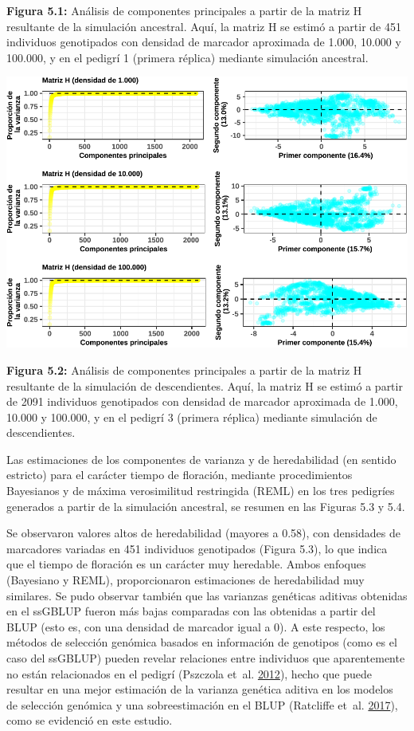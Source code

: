 \documentclass[11pt,spanish,a4paper,oneside,]{book} %
\begin{document}
\noindent
\textbf{Figura 5.1:} Análisis de componentes principales a partir de la matriz H resultante de la simulación ancestral. Aquí, la matriz H se estimó a partir de 451 individuos genotipados con densidad de marcador aproximada de 1.000, 10.000 y 100.000, y en el pedigrí 1 (primera réplica) mediante simulación ancestral.

\begin{center}\includegraphics[width=1\linewidth]{figures/Graf_PCA_mH_SeqBreed} \end{center}

\noindent
\textbf{Figura 5.2:} Análisis de componentes principales a partir de la matriz H resultante de la simulación de descendientes. Aquí, la matriz H se estimó a partir de 2091 individuos genotipados con densidad de marcador aproximada de 1.000, 10.000 y 100.000, y en el pedigrí 3 (primera réplica) mediante simulación de descendientes.

\hspace*{1em}

Las estimaciones de los componentes de varianza y de heredabilidad (en sentido estricto) para el carácter tiempo de floración, mediante procedimientos Bayesianos y de máxima verosimilitud restringida (REML) en los tres pedigríes generados a partir de la simulación ancestral, se resumen en las Figuras 5.3 y 5.4.

Se observaron valores altos de heredabilidad (mayores a 0.58), con densidades de marcadores variadas en 451 individuos genotipados (Figura 5.3), lo que indica que el tiempo de floración es un carácter muy heredable. Ambos enfoques (Bayesiano y REML), proporcionaron estimaciones de heredabilidad muy similares. Se pudo observar también que las varianzas genéticas aditivas obtenidas en el ssGBLUP fueron más bajas comparadas con las obtenidas a partir del BLUP (esto es, con una densidad de marcador igual a 0). A este respecto, los métodos de selección genómica basados en información de genotipos (como es el caso del ssGBLUP) pueden revelar relaciones entre individuos que aparentemente no están relacionados en el pedigrí (Pszczola et~al. \protect\hyperlink{ref-cite:74}{2012}), hecho que puede resultar en una mejor estimación de la varianza genética aditiva en los modelos de selección genómica y una sobreestimación en el BLUP (Ratcliffe et~al. \protect\hyperlink{ref-cite:72}{2017}), como se evidenció en este estudio.
\end{document}
